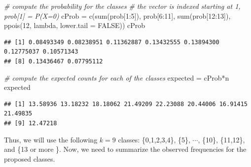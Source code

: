 \documentclass[
]{book}
\newenvironment{Shaded}{\begin{snugshade}}{\end{snugshade}}
\newcommand{\AttributeTok}[1]{\textcolor[rgb]{0.77,0.63,0.00}{#1}}
\newcommand{\CommentTok}[1]{\textcolor[rgb]{0.56,0.35,0.01}{\textit{#1}}}
\newcommand{\ConstantTok}[1]{\textcolor[rgb]{0.00,0.00,0.00}{#1}}
\newcommand{\DecValTok}[1]{\textcolor[rgb]{0.00,0.00,0.81}{#1}}
\newcommand{\FunctionTok}[1]{\textcolor[rgb]{0.00,0.00,0.00}{#1}}
\newcommand{\NormalTok}[1]{#1}
\newcommand{\OtherTok}[1]{\textcolor[rgb]{0.56,0.35,0.01}{#1}}
\newcommand{\SpecialCharTok}[1]{\textcolor[rgb]{0.00,0.00,0.00}{#1}}
\theoremstyle{definition}
\theoremstyle{definition}
\theoremstyle{definition}
\theoremstyle{definition}
\theoremstyle{remark}
\begin{document}
\begin{Shaded}
\begin{Highlighting}[]
\CommentTok{\# compute the probability for the classes}
\CommentTok{\# the vector is indexed starting at 1, prob[1] = P(X=0)}
\NormalTok{cProb }\OtherTok{=} \FunctionTok{c}\NormalTok{(}\FunctionTok{sum}\NormalTok{(prob[}\DecValTok{1}\SpecialCharTok{:}\DecValTok{5}\NormalTok{]), prob[}\DecValTok{6}\SpecialCharTok{:}\DecValTok{11}\NormalTok{], }\FunctionTok{sum}\NormalTok{(prob[}\DecValTok{12}\SpecialCharTok{:}\DecValTok{13}\NormalTok{]), }\FunctionTok{ppois}\NormalTok{(}\DecValTok{12}\NormalTok{, lambda, }\AttributeTok{lower.tail =} \ConstantTok{FALSE}\NormalTok{))}
\NormalTok{cProb}
\end{Highlighting}
\end{Shaded}

\begin{verbatim}
## [1] 0.08493349 0.08238951 0.11362887 0.13432555 0.13894300 0.12775037 0.10571343
## [8] 0.13436467 0.07795112
\end{verbatim}

\begin{Shaded}
\begin{Highlighting}[]
\CommentTok{\# compute the expected counts for each of the classes}
\NormalTok{expected }\OtherTok{=}\NormalTok{ cProb}\SpecialCharTok{*}\NormalTok{n}
\NormalTok{expected}
\end{Highlighting}
\end{Shaded}

\begin{verbatim}
## [1] 13.58936 13.18232 18.18062 21.49209 22.23088 20.44006 16.91415 21.49835
## [9] 12.47218
\end{verbatim}

Thus, we will use the following \(k=9\) classes: \{0,1,2,3,4\}, \{5\}, \(\cdots\), \{10\}, \{11,12\}, and \{13 or more \}. Now, we need to summarize the observed frequencies for the proposed classes.

\begin{Shaded}
\end{Shaded}
\end{document}
